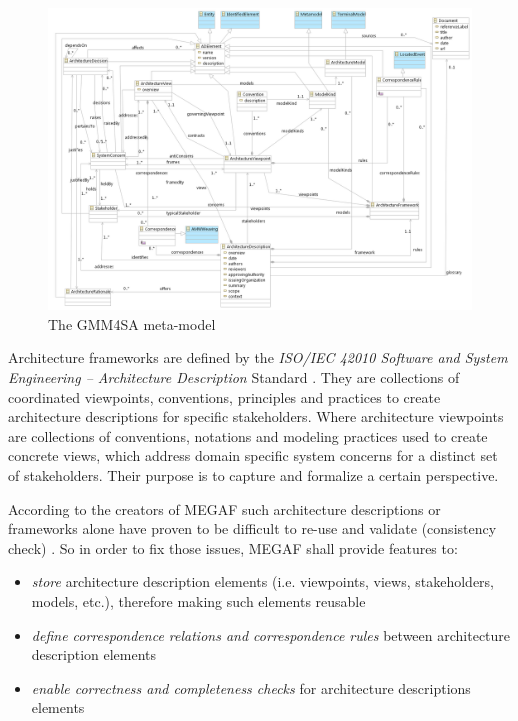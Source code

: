 \documentclass[runningheads,a4paper]{llncs}
\begin{document}
\begin{figure}
\centering
\includegraphics[width=\textwidth]{GMM4SA.png}
\caption{The GMM4SA meta-model}
\label{figure:GMM4SA}
\end{figure}

Architecture frameworks are defined by the \textit{ISO/IEC 42010 Software and System Engineering – Architecture Description} Standard \cite{ISO/IEC42010}. 
They are collections of coordinated viewpoints, conventions, principles and practices to create architecture descriptions for specific stakeholders. 
Where architecture viewpoints are collections of conventions, notations and modeling practices used to create concrete views, which address domain specific system concerns for a distinct set of stakeholders.
Their purpose is to capture and formalize a certain perspective.

According to the creators of MEGAF such architecture descriptions or frameworks alone have proven to be difficult to re-use and validate (consistency check) \cite{MEGAF}. 
So in order to fix those issues, MEGAF shall provide features to: 
\begin{itemize}

\item 
\textit{store} architecture description elements (i.e. viewpoints, views, stakeholders, models, etc.), therefore making such elements reusable

\item
\textit{define correspondence relations and correspondence rules} between architecture description elements

\item
\textit{enable correctness and completeness checks} for architecture descriptions elements

\end{itemize}
\end{document}
